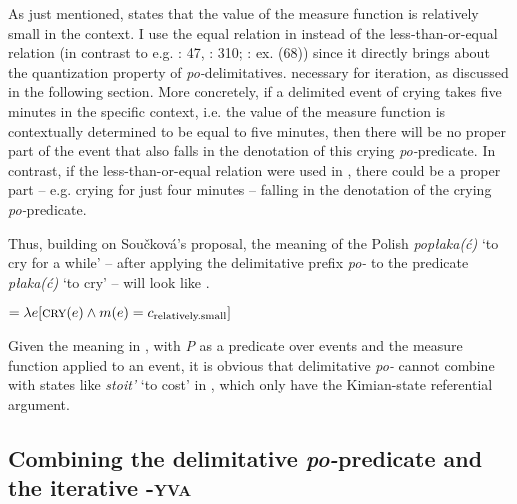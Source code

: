 \documentclass[output=paper,colorlinks,citecolor=brown]{langscibook}
\begin{document}
As just mentioned,  states that the value of the measure function is relatively small in the context. I use the equal relation in  instead of the less-than-or-equal relation (in contrast to e.g. \citealt{Kagan2015}: 47, \citeyear{Kagan2016}: 310; \citealt{KlimekJankowska.Blaszczak2023}: ex. (68)) since it directly brings about the quantization property of \textit{po-}delimitatives. necessary for iteration, as discussed in the following section. More concretely, if a delimited event of crying takes five minutes in the specific context, i.e. the value of the measure function is contextually determined to be equal to five minutes, then there will be no proper part of the event that also falls in the denotation of this crying \textit{po-}predicate. In contrast, if the less-than-or-equal relation were used in , there could be a proper part – e.g. crying for just four minutes – falling in the denotation of the crying \textit{po-}predicate.

Thus, building on Součková’s proposal, the meaning of the Polish \textit{popłaka(ć)} ‘to cry for a while’ -- after applying the delimitative prefix \textit{po-} to the predicate \textit{płaka(ć)} ‘to cry’ -- will look like . 

\ea\label{biskup:ex:poplaka}
 $= \lambda e [\textsc{cry}(e) \wedge m(e) =
 c\textsubscript{relatively.small}]$
\z

\noindent Given the meaning in , with \textit{P} as a predicate over events and the measure function applied to an event, it is obvious that delimitative \textit{po-} cannot combine with states like \textit{stoit'} ‘to cost’ in , which only have the Kimian-state referential argument.

\subsection{Combining the delimitative \textit{po-}predicate and the iterative \textsc{-yva}} \label{biskup:sec:combining}
\end{document}
